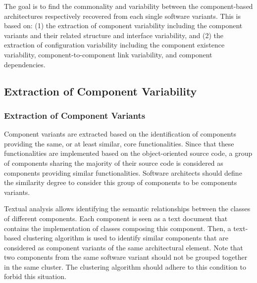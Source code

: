 \documentclass[graybox]{svmult}
\begin{document}
The goal is to find the commonality and variability between the component-based architectures respectively recovered from each single software variants. This is based on: (1) the extraction of component variability including the component variants and their related structure and interface variability, and (2) the extraction of configuration variability including the component existence variability, component-to-component link variability, and component dependencies.

\subsection{Extraction of Component Variability}
\subsubsection{Extraction of Component Variants}
Component variants are extracted based on the identification of components providing the same, or at least similar, core functionalities. Since that these functionalities are implemented based on the object-oriented source code, a group of components sharing the majority of their source code is considered as components providing similar functionalities. Software architects should define the similarity degree to consider this group of components to be components variants.

Textual analysis allows identifying the semantic relationships between the classes of different components. 
Each component is seen as a text document that contains the implementation of classes composing this component.
Then, a text-based clustering algorithm is used to identify similar components that are considered as component variants of the same architectural element. 
Note that two components from the same software variant should not be grouped together in the same cluster. The clustering algorithm should adhere to this condition to forbid this situation.
\end{document}
